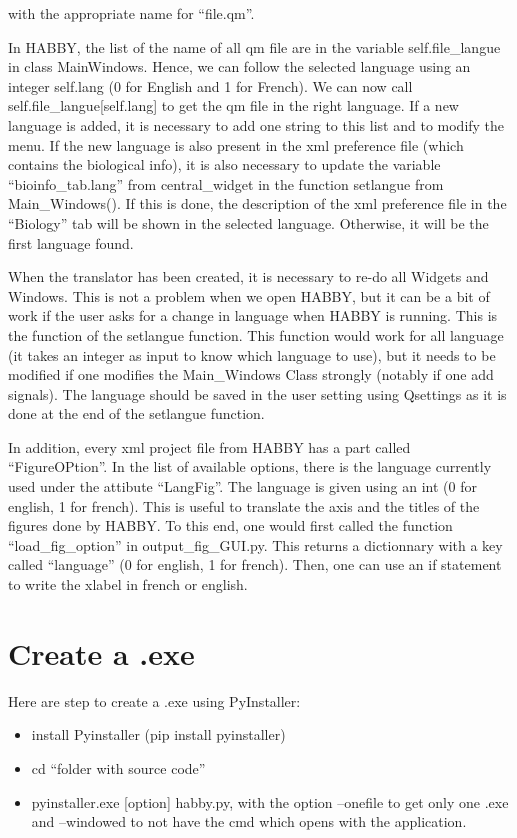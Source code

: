 \documentclass[letterpaper,10pt,english]{sphinxmanual}
\begin{document}
with the appropriate name for “file.qm”.

In HABBY, the list of the name of all qm file are in the variable self.file\_langue
in class MainWindows. Hence, we can follow the selected language using an integer self.lang
(0 for English and 1 for French). We can now call self.file\_langue{[}self.lang{]} to get the qm
file in the right language. If a new language is added, it is necessary to add one string to this
list and to modify the menu. If the new language is also present in the xml preference file
(which contains the biological info), it is also necessary to update the variable ``bioinfo\_tab.lang''
from central\_widget in the function setlangue from Main\_Windows(). If this is done, the description of
the xml preference file in the ``Biology'' tab will be shown in the selected language. Otherwise, it will be
the first language found.

When the translator has been created, it is necessary to re-do all Widgets and Windows. This is not a problem when we open HABBY, but it can be a bit of work if the user asks for a change in language when HABBY is running. This is the function of the setlangue function. This function would work for all language (it takes an integer as input to know which language to use), but it needs to be modified if one modifies the Main\_Windows Class strongly (notably if one add signals).
The language should be saved in the user setting using Qsettings as it is done at the end of the
setlangue function.

In addition, every xml project file from HABBY has a part called ``FigureOPtion''. In the list of available options, there is the language currently used under the attibute ``LangFig''. The language is given using an int (0 for english, 1 for french). This is useful to translate the axis and the titles of the figures done by HABBY. To this end, one would first called the function ``load\_fig\_option'' in output\_fig\_GUI.py. This returns a dictionnary with a key called ``language'' (0 for english, 1 for french). Then, one can use an if statement to write the xlabel in french or english.


\section{Create a .exe}
\label{\detokenize{index:create-a-exe}}
Here are step to create a .exe using PyInstaller:
\begin{itemize}
\item {} 
install Pyinstaller (pip install pyinstaller)

\item {} 
cd ``folder with source code''

\item {} 
pyinstaller.exe {[}option{]} habby.py, with the option --onefile to get only one .exe and --windowed to not have the cmd which opens with the application.

\end{itemize}
\end{document}
